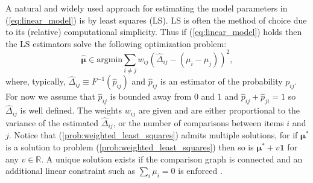 \documentclass[twoside,11pt]{article}
\begin{document}
A natural and widely used approach for estimating the model parameters in (\ref{eq:linear_model}) is by least squares (LS). LS is often the method of choice due to its (relative) computational simplicity. Thus if (\ref{eq:linear_model}) holds then the LS estimators solve the following optimization problem:
 \begin{equation}
 \label{prob:weighted_least_squares}
  \hat{\boldsymbol{\mu}} \in \text{argmin} \sum_{i \neq j} w_{ij} (\hat \Delta_{ij} - (\mu_i - \mu_j))^2,
\end{equation}
where, typically, $\hat \Delta_{ij} \equiv F^{-1}(\hat{p}_{ij}) $ and $\hat{p}_{ij}$ is an estimator of the probability $p_{ij}$. For now we assume that $\hat{p}_{ij}$ is bounded away from $0$ and $1$ and $\hat{p}_{ij}+\hat{p}_{ji} = 1$ so $\hat \Delta_{ij}$ is well defined. The weights $w_{ij}$ are given and are either proportional to the variance of the estimated $\hat \Delta_{ij}$, or the number of comparisons between items $i$ and $j$. Notice that  (\ref{prob:weighted_least_squares}) admits multiple solutions, for if $\boldsymbol{\mu}^*$ is a solution to problem (\ref{prob:weighted_least_squares}) then so is $\boldsymbol{\mu}^* + v \boldsymbol{1}$ for any $v\in \mathbb{R}$. A unique solution exists if the comparison graph is connected and an additional linear constraint such as $\sum_i \mu_i = 0$ is enforced \citep{tsukida}.
\end{document}
